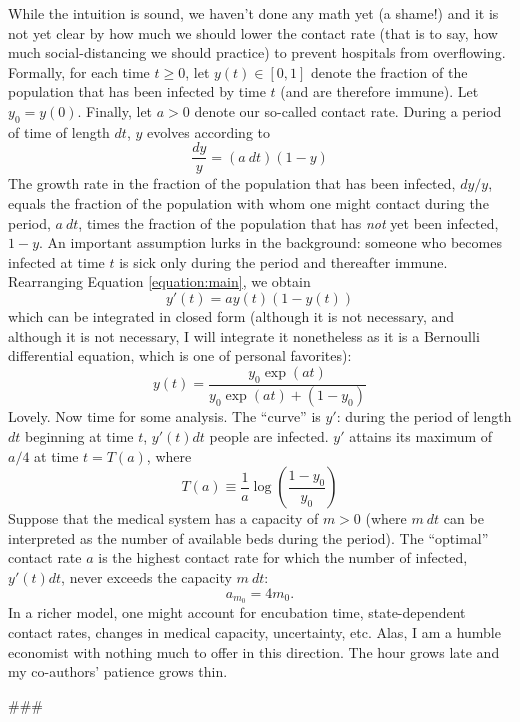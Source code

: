 \documentclass[12pt]{article}
\begin{document}
While the intuition is sound, we haven't done any math yet (a shame!) and it is not yet clear by how much we should lower the contact rate (that is to say, how much social-distancing we should practice) to prevent hospitals from overflowing. Formally, for each time $t\geq0$, let $y(t)\in[0,1]$ denote the fraction of the population that has been infected by time $t$ (and are therefore immune). Let $y_{0}=y(0)$. Finally, let $a>0$ denote our so-called contact rate. During a period of time of length $dt$, $y$ evolves according to
\begin{equation}\label{equation:main}
	\frac{dy}{y}=(a\: dt)(1-y)
\end{equation}
The growth rate in the fraction of the population that has been infected, $dy/y$, equals the fraction of the population with whom one might contact during the period, $a\: dt$, times the fraction of the population that has \textit{not} yet been infected, $1-y$. An important assumption lurks in the background: someone who becomes infected at time $t$ is sick only during the period and thereafter immune. Rearranging Equation \ref{equation:main}, we obtain 
\begin{equation}
	y'(t)=ay(t)(1-y(t))
\end{equation} 
which can be integrated in closed form (although it is not necessary, and although it is not necessary, I will integrate it nonetheless as it is a Bernoulli differential equation, which is one of personal favorites):
\begin{equation}
	y(t)=\frac{y_{0}\exp(at)}{y_{0}\exp(at)+(1-y_{0})}
\end{equation}
Lovely. Now time for some analysis. The ``curve'' is $y'$: during the period of length $dt$ beginning at time $t$, $y'(t)dt$ people are infected. $y'$ attains its maximum of $a/4$ at time $t=T(a)$, where
\begin{equation}
	T(a)\equiv\frac{1}{a}\log\left(\frac{1-y_{0}}{y_{0}}\right)
\end{equation}
Suppose that the medical system has a capacity of $m>0$ (where $m\: dt$ can be interpreted as the number of available beds during the period). The ``optimal'' contact rate $a$ is the highest contact rate for which the number of infected, $y'(t)dt$, never exceeds the capacity $m\: dt$: 
\begin{equation}
	a_{m_{0}}=4m_{0}.
\end{equation}
In a richer model, one might account for encubation time, state-dependent contact rates, changes in medical capacity, uncertainty, etc. Alas, I am a humble economist with nothing much to offer in this direction. The hour grows late and my co-authors' patience grows thin.
\begin{center}
	\#\#\#
\end{center}
\end{document}
